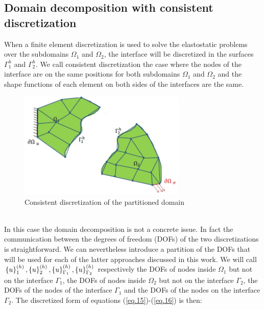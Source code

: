  \subsection{Domain decomposition with consistent discretization}\label{ssec31}
 When a finite element discretization is used to solve the elastostatic problems over the subdomains $\Omega_1$ and $\Omega_2$, the interface will be discretized in the surfaces $\Gamma_1^h$ and $\Gamma_2^h$.  
 We call consistent discretization the case where the nodes of the interface are on the same positions for both subdomains $\Omega_1$ and $\Omega_2$ and the shape functions of each element on both sides of the interfaces are the same.
 \begin{figure}[ht]
 \centering
 \includegraphics[width=8cm]{images/Ch1/Consistent_discretization}
 \caption{Consistent discretization of the partitioned domain} 
 \label{fig.3}
 \end{figure}
 \\
 In this case the domain decomposition is not a concrete issue. In fact the communication between the degrees of freedom (DOFs) of the two discretizations is straightforward. We can nevertheless introduce a partition of the DOFs that will be used for each of the latter approaches discussed in this work.
 We will call $\left\lbrace{u}\right \rbrace_1^{(h)},\left\lbrace{u}\right \rbrace_2^{(h)},\left\lbrace{u}\right \rbrace_{\Gamma_1}^{(h)},\left\lbrace{u}\right \rbrace_{\Gamma_2}^{(h)}$ respectively the DOFs of nodes inside $\Omega_1$ but not on the interface $\Gamma_1$, the DOFs of nodes inside $\Omega_2$ but not on the interface $\Gamma_2$, the DOFs of the nodes of the interface $\Gamma_1$ and the DOFs of the nodes on the interface $\Gamma_2$. The discretized form of equations (\ref{eq.15})-(\ref{eq.16}) is then: 
